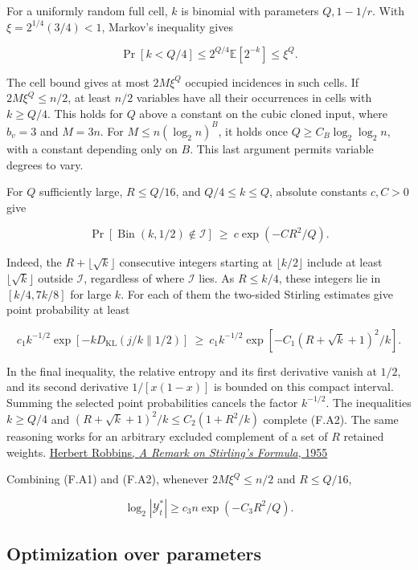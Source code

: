 \documentclass[
  11pt,
]{article}
\begin{document}
For a uniformly random full cell, \(k\) is binomial with parameters
\(Q,1-1/r\). With \(\xi=2^{1/4}(3/4)<1\), Markov's inequality gives

\[
 \Pr[k<Q/4]\le 2^{Q/4}\mathbb E[2^{-k}]\le \xi^Q.
\]

The cell bound gives at most \(2M\xi^Q\) occupied incidences in such
cells. If \(2M\xi^Q\le n/2\), at least \(n/2\) variables have all their
occurrences in cells with \(k\ge Q/4\). This holds for \(Q\) above a
constant on the cubic cloned input, where \(b_v=3\) and \(M=3n\). For
\(M\le n(\log_2 n)^B\), it holds once \(Q\ge C_B\log_2\log_2 n\), with a
constant depending only on \(B\). This last argument permits variable
degrees to vary.

For \(Q\) sufficiently large, \(R\le Q/16\), and \(Q/4\le k\le Q\),
absolute constants \(c,C>0\) give

\[
 \Pr[\operatorname{Bin}(k,1/2)\notin\mathcal I]\ \ge\
 c\exp(-C R^2/Q).                                      \tag{F.A2}
\]

Indeed, the \(R+\lfloor\sqrt k\rfloor\) consecutive integers starting at
\(\lfloor k/2\rfloor\) include at least \(\lfloor\sqrt k\rfloor\)
outside \(\mathcal I\), regardless of where \(\mathcal I\) lies. As
\(R\le k/4\), these integers lie in \([k/4,7k/8]\) for large \(k\). For
each of them the two-sided Stirling estimates give point probability at
least

\[
 c_1 k^{-1/2}\exp[-k D_{\mathrm{KL}}(j/k\|1/2)]
 \ \ge\ c_1 k^{-1/2}\exp[-C_1(R+\sqrt k+1)^2/k].
\]

In the final inequality, the relative entropy and its first derivative
vanish at \(1/2\), and its second derivative \(1/[x(1-x)]\) is bounded
on this compact interval. Summing the selected point probabilities
cancels the factor \(k^{-1/2}\). The inequalities \(k\ge Q/4\) and
\((R+\sqrt{k}+1)^2/k\le C_2(1+R^2/k)\) complete (F.A2). The same
reasoning works for an arbitrary excluded complement of a set of \(R\)
retained weights. \href{https://www.jstor.org/stable/2308012}{Herbert
Robbins, \emph{A Remark on Stirling's Formula}, 1955}

Combining (F.A1) and (F.A2), whenever \(2M\xi^Q\le n/2\) and
\(R\le Q/16\),

\[
  \log_2|\mathcal Y_t^*|\ge c_3 n\exp(-C_3 R^2/Q).       \tag{F.A3}
\]

\subsection{Optimization over
parameters}\label{optimization-over-parameters}
\end{document}
